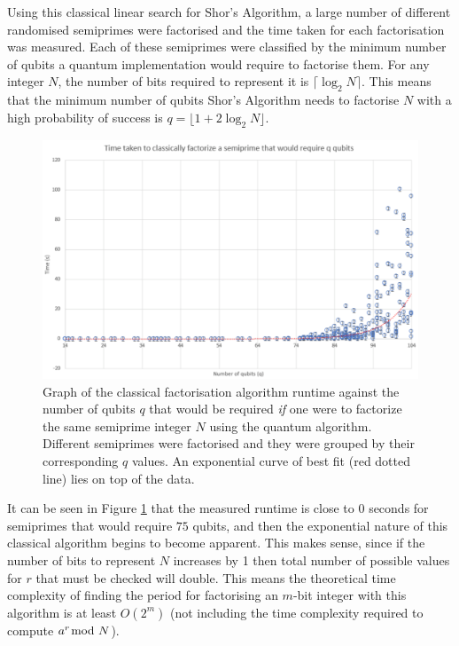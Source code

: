 \documentclass{article}[11pt]
\begin{document}
Using this classical linear search for Shor's Algorithm, a large number of different randomised semiprimes were factorised and the time taken for each factorisation was measured. Each of these semiprimes were classified by the minimum number of qubits a quantum implementation would require to factorise them. For any integer $N$, the number of bits required to represent it is $\lceil\log_2N\rceil$. This means that the minimum number of qubits Shor's Algorithm needs to factorise $N$ with a high probability of success is\cite{candela} $q=\lfloor1+2\log_2N\rfloor$.
\begin{figure}[H]
\centering
\includegraphics[width=\textwidth]{Pictures/Time taken to classically factorize a semiprime that would require q qubits Large.png}
\caption{Graph of the classical factorisation algorithm runtime against the number of qubits $q$ that would be required \emph{if} one were to factorize the same semiprime integer $N$ using the quantum algorithm. Different semiprimes were factorised and they were grouped by their corresponding $q$ values. An exponential curve of best fit (red dotted line) lies on top of the data.}
\label{fig:Classical factorization graph}
\end{figure}

It can be seen in Figure \ref{fig:Classical factorization graph} that the measured runtime is close to $0$ seconds for semiprimes that would require $75$ qubits, and then the exponential nature of this classical algorithm begins to become apparent. This makes sense, since if the number of bits to represent $N$ increases by 1 then total number of possible values for $r$ that must be checked will double. This means the theoretical time complexity of finding the period for factorising an $m$-bit integer with this algorithm is at least $O(2^m)$ (not including the time complexity required to compute $a^r\hspace{-0.2cm}\mod N$).
\end{document}

